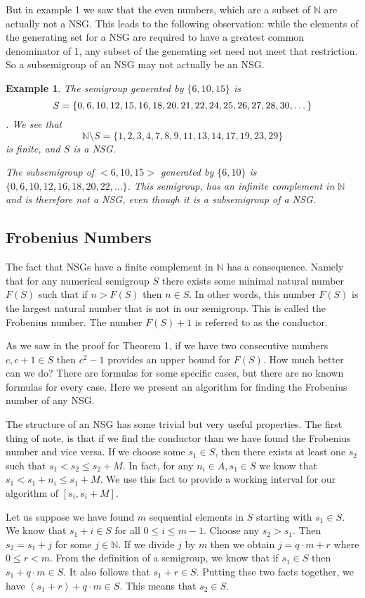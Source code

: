 \documentclass[11pt]{amsart}
\theoremstyle{plain}
\newtheorem{exa}{Example}
\theoremstyle{definition}
\begin{document}
But in example 1 we saw that the even numbers, which are a subset of $\mathbb{N}$ are actually not a NSG. This leads to the following observation: while the elements of the generating set for a NSG are required to have a greatest common denominator of 1, any subset of the generating set need not meet that restriction. So a subsemigroup of an NSG may not actually be an NSG.
\begin{exa}
  The semigroup generated by $\{6,10,15\}$ is $$S=\{0, 6, 10, 12, 15, 16, 18,
  20, 21, 22,\\ 24, 25, 26, 27, 28, 30, \dots \}$$. We see that $$\mathbb{N}\setminus
  S=\{1,2,3,4,7,8,9,11,13,
  14,17,19,23,29\}$$ is finite, and $S$ is a NSG.

  The subsemigroup of $<6,10,15>$ generated by $\{6,10\}$ is $\{0,6,10,12,16,18,20,22,\dots\}$. This semigroup, has an infinite complement in $\mathbb{N}$ and is therefore not a NSG, even though it is a subsemigroup of a NSG.
\end{exa}
\subsection{Frobenius Numbers}
The fact that NSGs have a finite complement in $\mathbb{N}$ has
a consequence. Namely that for any numerical semigroup $S$ there exists some minimal
natural number $F(S)$ such that if $n>F(S)$ then $n\in S$. In other words, this number
$F(S)$ is the largest natural number that is not in our semigroup. This is
called the Frobenius number. The number $F(S)+1$ is referred to as
the conductor\cite{rosales}.

As we saw in the proof for Theorem 1, if we have two consecutive numbers $c,c+1\in S$ then $c^2-1$ provides an upper bound for $F(S)$.
How much better can we do?
There are formulas for some specific cases, but there are no known formulas for every case.
Here we present an algorithm for finding the Frobenius number of any NSG.

The structure of an NSG has some trivial but very useful properties.
The first thing of note, is that if we find the conductor than  we have found the Frobenius number and vice versa.
If we choose some $s_1\in S$, then there exists at least one $s_2$ such that
$s_1<s_2\le s_2+M$.
In fact, for any $n_i\in A,s_1\in S$ we know that $s_1<s_1+n_i\le s_1+M$.
We use this fact to provide a working interval for our algorithm of $[s_i,s_i+M]$.

Let us suppose we have found $m$ sequential elements in $S$ starting with $s_1\in S$.
We know that $s_1+i\in S$ for all $0\le i\le m-1$.
Choose any $s_2>s_1$. Then $s_2=s_1+j$ for some $j\in \mathbb{N}$.
If we divide $j$ by $m$ then we obtain $j=q\cdot m+r$ where $0\le r< m$.
From the definition of a semigroup, we know that if $s_1\in S$ then $s_1+q\cdot m\in S$.
It also follows that $s_1+r\in S$.
Putting thse two facts together, we have $(s_1+r)+q\cdot m\in S$.
This means that $s_2\in S$.
\end{document}
